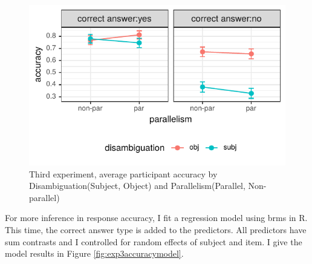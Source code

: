 \begin{knitrout}
\color{fgcolor}\begin{figure}[hbt!]

{\centering \includegraphics[]{experiments/equivalance/report/figure/exp3accuracy-1.pdf} 

}

\caption[Third experiment, average participant accuracy by Disambiguation(Subject, Object) and Parallelism(Parallel, Non-parallel)]{Third experiment, average participant accuracy by Disambiguation(Subject, Object) and Parallelism(Parallel, Non-parallel)}\label{fig:exp3accuracy}
\end{figure}


\end{knitrout}

For more inference in response accuracy, I fit a regression model using brms in R. This time, the correct answer type is added to the predictors. All predictors have sum contrasts and I controlled for random effects of subject and item. I give the model results in Figure \ref{fig:exp3accuracymodel}.

